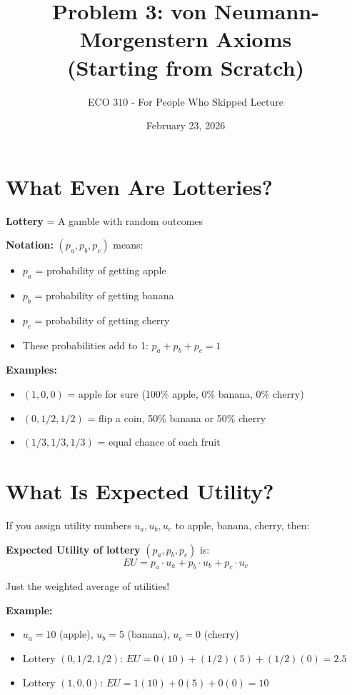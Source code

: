 \documentclass[11pt]{article}
\title{Problem 3: von Neumann-Morgenstern Axioms \\ (Starting from Scratch)}
\author{ECO 310 - For People Who Skipped Lecture}
\date{February 23, 2026}
\begin{document}
\maketitle

\section{What Even Are Lotteries?}

\textbf{Lottery} = A gamble with random outcomes

\textbf{Notation:} $(p_a, p_b, p_c)$ means:
\begin{itemize}
\item $p_a$ = probability of getting apple
\item $p_b$ = probability of getting banana
\item $p_c$ = probability of getting cherry
\item These probabilities add to 1: $p_a + p_b + p_c = 1$
\end{itemize}

\textbf{Examples:}
\begin{itemize}
\item $(1, 0, 0)$ = apple for sure (100\% apple, 0\% banana, 0\% cherry)
\item $(0, 1/2, 1/2)$ = flip a coin, 50\% banana or 50\% cherry
\item $(1/3, 1/3, 1/3)$ = equal chance of each fruit
\end{itemize}

\section{What Is Expected Utility?}

If you assign utility numbers $u_a, u_b, u_c$ to apple, banana, cherry, then:

\begin{tcolorbox}[colback=blue!5!white,colframe=blue!75!black,title=Expected Utility Formula]
\textbf{Expected Utility of lottery} $(p_a, p_b, p_c)$ is:
$$EU = p_a \cdot u_a + p_b \cdot u_b + p_c \cdot u_c$$

Just the weighted average of utilities!
\end{tcolorbox}

\textbf{Example:}
\begin{itemize}
\item $u_a = 10$ (apple), $u_b = 5$ (banana), $u_c = 0$ (cherry)
\item Lottery $(0, 1/2, 1/2)$: $EU = 0(10) + (1/2)(5) + (1/2)(0) = 2.5$
\item Lottery $(1, 0, 0)$: $EU = 1(10) + 0(5) + 0(0) = 10$
\end{itemize}
\end{document}
